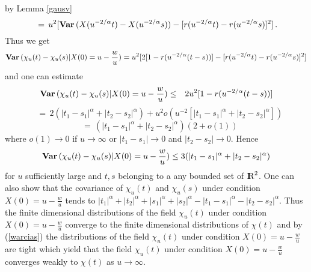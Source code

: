 by Lemma \ref{gausv}
$$
\,\,=\, u^2[{\bf Var\,}(X(u^{-2/\alpha}t)-X(u^{-2/\alpha}s))-[r(u^{-2/\alpha}t)-r(u^{-2/\alpha}s)]^2]\,.
$$
Thus we get
$$
{\bf Var\,}(\chi_u(t)-\chi_u(s)|X(0)=u-\frac{w}{u})=u^2[2[1-r(u^{-2/\alpha}(t-s))]-[r(u^{-2/\alpha}t)-r(u^{-2/\alpha}s)]^2]
$$
and one can estimate 
\begin{eqnarray*}
{\bf Var\,}(\chi_u(t)-\chi_u(s)|X(0)=u-\frac{w}{u})&\leq & 2u^2[1-r(u^{-2/\alpha}(t-s))]
\end{eqnarray*}
$$
\,\,\,\,\,= \,2(|t_1-s_1|^\alpha+|t_2-s_2|^\alpha)+u^2o(u^{-2}[|t_1-s_1|^\alpha+|t_2-s_2|^\alpha])
$$
$$
\,\,\,\,\,= \,(|t_1-s_1|^\alpha+|t_2-s_2|^\alpha)(2+o(1))
$$
where $o(1)\rightarrow 0$ if $u\rightarrow\infty$ or $|t_1-s_1|\rightarrow 0$ and $|t_2-s_2|\rightarrow 0$.
Hence
\begin{equation}\label{warcias}
{\bf Var\,}(\chi_u(t)-\chi_u(s)|X(0)=u-\frac{w}{u})\leq 3(|t_1-s_1|^\alpha+|t_2-s_2|^\alpha)
\end{equation}
for $u$ sufficiently large and $t,s$ belonging to a any bounded set of ${\rm I\hspace{-0.8mm}R}^2$.
One can also show that the covariance of $\chi_u(t)$ and $\chi_u(s)$ under condition $X(0)=u-\frac{w}{u}$
tends to $|t_1|^\alpha+|t_2|^\alpha+|s_1|^\alpha+|s_2|^\alpha-|t_1-s_1|^\alpha-|t_2-s_2|^\alpha$. Thus the finite dimensional distributions of the field $\chi_u(t)$ under condition $X(0)=u-\frac{w}{u}$ converge to
the finite dimensional distributions of $\chi(t)$ and by (\ref{warcias}) the distributions of the field $\chi_u(t)$ under condition $X(0)=u-\frac{w}{u}$ are tight which yield that the field $\chi_u(t)$ under condition $X(0)=u-\frac{w}{u}$ converges
weakly to $\chi(t)$ as $u\rightarrow\infty$.

